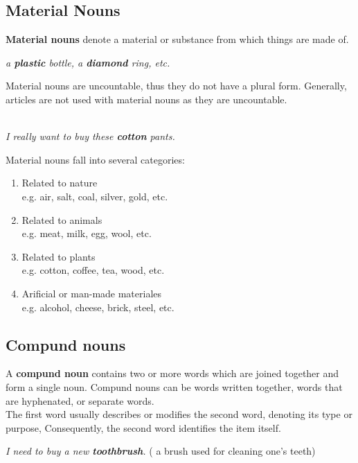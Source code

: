 \documentclass[10pt,a4paper]{article}
\begin{document}
\subsection{Material Nouns}
\textbf{Material nouns} denote a material or substance from which things are made of.
\begin{center}
		\textit{		a \textbf{plastic} bottle, a \textbf{diamond} ring, etc.}
\end{center}
Material nouns are uncountable, thus they do not have a plural form. Generally, articles are not used with material nouns as they are uncountable.
\begin{center}
\textit{
		\\
I really want to buy these \textbf{cotton} pants.}
\end{center}

Material nouns fall into several categories:
\begin{center}
		\begin{enumerate}[label=\alph*)]
		\item Related to nature\\
				e.g. air, salt, coal, silver, gold, etc.
		\item Related to animals\\
				e.g. meat, milk, egg, wool, etc.
		\item Related to plants\\
				e.g. cotton, coffee, tea, wood, etc.
		\item Arificial or man-made materiales\\
				e.g. alcohol, cheese, brick, steel, etc.
		\end{enumerate}
\end{center}

\subsection{Compund nouns}
A \textbf{compund noun} contains two or more words which are joined together and form a single noun. Compund nouns can be words written together, words that are hyphenated, or separate words.\\
The first word usually describes or modifies the second word, denoting its type or purpose, Consequently, the second word identifies the item itself.
\begin{center}
\textit{
I need to buy a new \textbf{toothbrush}.} ( a brush used for cleaning one's teeth)
\end{center}
\end{document}
